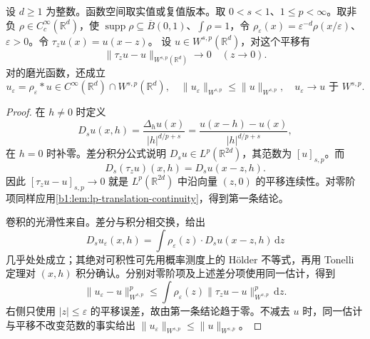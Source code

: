 \begin{proposition}\label{b1:prop:fractional-translation-mollification}
设 \(d\geq1\) 为整数。函数空间取实值或复值版本。取 \(0<s<1\)、\(1\leq p<\infty\)。取非负 \(\rho\in C_c^\infty(\mathbb R^d)\)，使 \(\operatorname{supp}\rho\subseteq\overline B(0,1)\)、\(\int\rho=1\)，令 \(\rho_\varepsilon(x)=\varepsilon^{-d}\rho(x/\varepsilon)\)、\(\varepsilon>0\)。令 \(\tau_zu(x)=u(x-z)\)。
设 \(u\in W^{s,p}(\mathbb R^d)\)，对这个平移有
\[
 \|\tau_zu-u\|_{W^{s,p}(\mathbb R^d)}\longrightarrow0\quad(z\to0).
\]
对的磨光函数，还成立
\[
 u_\varepsilon=\rho_\varepsilon*u\in C^\infty(\mathbb R^d)\cap W^{s,p}(\mathbb R^d),
 \quad\|u_\varepsilon\|_{W^{s,p}}\leq\|u\|_{W^{s,p}},
 \quad u_\varepsilon\to u\text{ 于 }W^{s,p}.
\]
\end{proposition}
\begin{proof}
在 \(h\ne0\) 时定义
\[
 D_su(x,h)=\frac{\Delta_hu(x)}{|h|^{d/p+s}}
 =\frac{u(x-h)-u(x)}{|h|^{d/p+s}},
\]
在 \(h=0\) 时补零。差分积分公式说明 \(D_su\in L^p(\mathbb R^{2d})\)，其范数为 \([u]_{s,p}\)。而
\[
 D_s(\tau_zu)(x,h)=D_su(x-z,h).
\]
因此 \([\tau_zu-u]_{s,p}\to0\) 就是 \(L^p(\mathbb R^{2d})\) 中沿向量 \((z,0)\) 的平移连续性。对零阶项同样应用\cref{b1:lem:lp-translation-continuity}，得到第一条结论。

卷积的光滑性来自。差分与积分相交换，给出
\[
 D_su_\varepsilon(x,h)
 =\int\rho_\varepsilon(z)\cdot D_su(x-z,h)\,\mathrm dz
\]
几乎处处成立；其绝对可积性可先用概率测度上的 Hölder 不等式，再用 Tonelli 定理对 \((x,h)\) 积分确认。分别对零阶项及上述差分项使用同一估计，得到
\[
 \|u_\varepsilon-u\|_{W^{s,p}}^p
 \leq\int\rho_\varepsilon(z)\|\tau_zu-u\|_{W^{s,p}}^p\,\mathrm dz.
\]
右侧只使用 \(|z|\leq\varepsilon\) 的平移误差，故由第一条结论趋于零。不减去 \(u\) 时，同一估计与平移不改变范数的事实给出 \(\|u_\varepsilon\|_{W^{s,p}}\leq\|u\|_{W^{s,p}}\)。
\end{proof}

